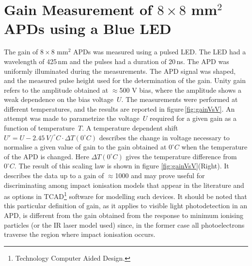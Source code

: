 \documentclass[review,number,sort&compress]{elsarticle}
\begin{document}
\section{Gain Measurement of $8 \times 8$ mm$^2$ APDs using a Blue LED}
\label{sec:gain8x8led}

The gain of $8 \times 8$ mm$^2$ APDs was measured using a pulsed LED.
The LED had a wavelength of 425\,nm and the pulses had a duration of 20\,ns.
The APD was uniformly illuminated during the measurements.
The APD signal was shaped, and the measured pulse height used for the determination of the gain.
Unity gain refers to the amplitude obtained at $\approx$500 V bias, where the amplitude shows a weak dependence on the bias voltage~$U$.
The measurements were performed at different temperatures, and the results are reported in figure\,\ref{fig:gainVsV}.
An attempt was made to parametrize the  voltage~$U$ required for a given gain as a function of temperature~$T$.
A temperature dependent shift $U' = U -2.45~ V/^\circ C \cdot \Delta T( 0^\circ C)$ describes the change in voltage necessary to normalise a given value of gain to the gain obtained at $0^\circ C$ when the temperature of the APD is changed.
Here $\Delta T( 0^\circ C)$ gives the temperature difference from $0^\circ C$. 
The result of this scaling law is shown in figure \ref{fig:gainVsV}(Right).
It describes the data up to a gain of $\approx$1000 and may prove useful for discriminating among impact ionisation models that appear in the literature and as options in TCAD\footnote{Technology Computer Aided Design.} software for modelling such devices.
It should be noted that this particular definition of gain, as it applies to visible light photodetection in an APD, is different from the gain obtained from the response to minimum ionising particles (or the IR laser model used) since, in the former case all photoelectrons traverse the region where impact ionisation occurs.
\end{document}
